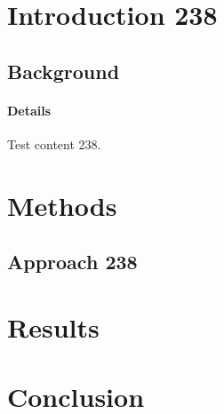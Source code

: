 \documentclass{article}
\begin{document}
\section{Introduction 238}
\subsection{Background}
\paragraph{Details} Test content 238.
\section{Methods}
\subsection{Approach 238}
\section{Results}
\section{Conclusion}
\end{document}
